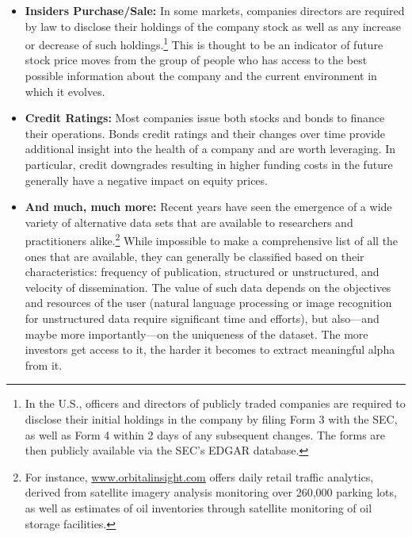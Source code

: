 \begin{itemize}
\item \textbf{Insiders Purchase/Sale:} In some markets, companies directors are required by law to disclose their holdings of the company stock as well as any increase or decrease of such holdings.\footnote{In the U.S., officers and directors of publicly traded companies are required to disclose their initial holdings in the company by filing Form 3 with the SEC, as well as Form 4 within 2 days of any subsequent changes. The forms are then publicly available via the SEC's EDGAR database.} This is thought to be an indicator of future stock price moves from the group of people who has access to the best possible information about the company and the current environment in which it evolves.


\item \textbf{Credit Ratings:} Most companies issue both stocks and bonds to finance their operations. Bonds credit ratings and their changes over time provide additional insight into the health of a company and are worth leveraging. In particular, credit downgrades resulting in higher funding costs in the future generally have a negative impact on equity prices.


\item \textbf{And much, much more:} Recent years have seen the emergence of a wide variety of alternative data sets that are available to researchers and practitioners alike.\footnote{For instance, \url{www.orbitalinsight.com} offers daily retail traffic analytics, derived from satellite imagery analysis monitoring over 260,000 parking lots, as well as estimates of oil inventories through satellite monitoring of oil storage facilities.} While impossible to make a comprehensive list of all the ones that are available, they can generally be classified based on their characteristics: frequency of publication, structured or unstructured, and velocity of dissemination. The value of such data depends on the objectives and resources of the user (natural language processing or image recognition for unstructured data require significant time and efforts), but also---and maybe more importantly---on the uniqueness of the dataset. The more investors get access to it, the harder it becomes to extract meaningful alpha from it.
\end{itemize}







